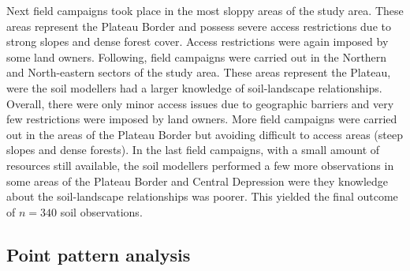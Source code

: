 Next field campaigns took place in the most sloppy areas of the study area. These areas represent the Plateau 
Border and possess severe access restrictions due to strong slopes and dense forest cover. Access restrictions 
were again imposed by some land owners. Following, field campaigns were carried out in the Northern and 
North-eastern sectors of the study area. These areas represent the Plateau, were the soil modellers had a 
larger knowledge of soil-landscape relationships. Overall, there were only minor access issues due to 
geographic barriers and very few restrictions were imposed by land owners. More field campaigns were carried 
out in the areas of the Plateau Border but avoiding difficult to access areas (steep slopes and dense forests).
In the last field campaigns, with a small amount of resources still available, the soil modellers performed a 
few more observations in some areas of the Plateau Border and Central Depression were they knowledge about the 
soil-landscape relationships was poorer. This yielded the final outcome of $n = 340$ soil observations.

\subsection{Point pattern analysis}
\label{subsec:chap06-ppa}

